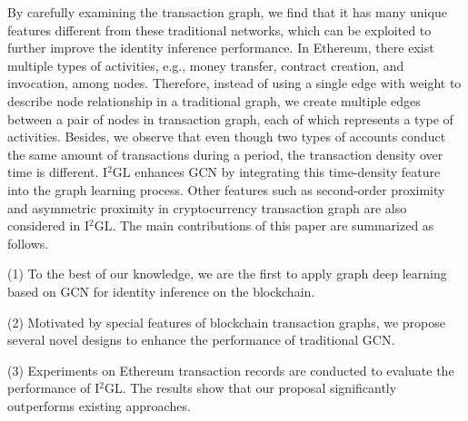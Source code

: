 
 By carefully examining the transaction graph, we find that it has many unique features different from these traditional networks, which can be exploited to further improve the identity inference performance. In Ethereum, there exist multiple types of activities, e.g., money transfer, contract creation, and invocation, among nodes. Therefore, instead of using a single edge with weight to describe node relationship in a traditional graph, we create multiple edges between a pair of nodes in transaction graph, each of which represents a type of activities. Besides, we observe that even though two types of accounts conduct the same amount of transactions during a period, the transaction density over time is different. I$^2$GL enhances GCN by integrating this time-density feature into the graph learning process. Other features such as second-order proximity and asymmetric proximity in cryptocurrency transaction graph are also considered in I$^2$GL. The main contributions of this paper are summarized as follows.

(1) To the best of our knowledge, we are the first to apply graph deep learning based on GCN for identity inference on the blockchain. 

(2) Motivated by special features of blockchain transaction graphs, we propose several novel designs to enhance the performance of traditional GCN.

(3) Experiments on Ethereum transaction records are conducted to evaluate the performance of I$^2$GL. The results show that our proposal significantly outperforms existing approaches.

